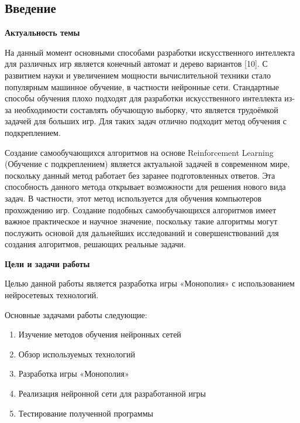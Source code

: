 
\setlength{\parskip}{0cm}
\begin{Large}
\newpage
\section*{Введение}
\textbf{Актуальность темы}

На данный момент основными способами разработки искусственного интеллекта для различных игр является конечный автомат и дерево вариантов [10]. С развитием науки и увеличением мощности вычислительной техники стало популярным машинное обучение, в частности нейронные сети. Стандартные способы обучения плохо подходят для разработки искусственного интеллекта из-за необходимости составлять обучающую выборку, что является трудоёмкой задачей для больших игр. Для таких задач отлично подходит метод обучения с подкреплением. 

Создание самообучающихся алгоритмов на основе Reinforcement Learning (Обучение с подкреплением) является актуальной задачей в современном мире, поскольку данный метод работает без заранее подготовленных ответов. Эта способность данного метода открывает возможности для решения нового вида задач. В частности, этот метод используется для обучения компьютеров прохождению игр. Создание подобных самообучающихся алгоритмов имеет важное практическое и научное значение, поскольку такие алгоритмы могут послужить основой для дальнейших исследований и совершенствований для создания алгоритмов, решающих реальные задачи. 

\textbf{Цели и задачи работы}

Целью данной работы является разработка игры «Монополия» с использованием нейросетевых технологий.

Основные задачами работы следующие:
\begin{spacing}{0.9}
\begin{enumerate}
    \item Изучение методов обучения нейронных сетей
    \item Обзор используемых технологий
    \item Разработка игры «Монополия»
    \item Реализация нейронной сети для разработанной игры
    \item Тестирование полученной программы
\end{enumerate}
\end{spacing}
\end{Large}